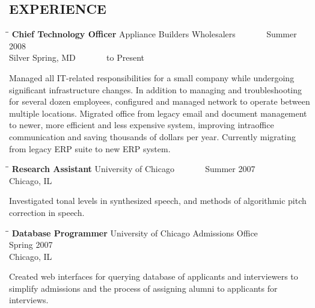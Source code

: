 \documentclass{res}
\begin{document}
\begin{resume}
\section{EXPERIENCE}
   \vspace{-0.1in}	
   \begin{tabbing}
   \hspace{2.3in}\= \hspace{2.6in}\= \kill %
    {\bf Chief Technology Officer} \>Appliance Builders Wholesalers \> ~~~~~~ Summer 2008 \\
                             \>Silver Spring, MD                    \> ~~~~~~ to Present
   \end{tabbing}\vspace{-20pt}      %
    Managed all IT-related responsibilities for a small company while undergoing significant
    infrastructure changes. In addition to managing and troubleshooting for several dozen employees,
    configured and managed network to operate between multiple locations. Migrated office from legacy
    email and document management to newer, more efficient and less expensive system, improving
    intraoffice communication and saving thousands of dollars per year. Currently migrating from legacy ERP
    suite to new ERP system.
   \begin{tabbing}
   \hspace{2.3in}\= \hspace{2.6in}\= \kill %
    {\bf Research Assistant} \>University of Chicago \> ~~~~~~ Summer 2007\\
                          \>Chicago, IL
   \end{tabbing}\vspace{-20pt}
   Investigated tonal levels in synthesized speech, and methods of algorithmic pitch correction
   in speech.
   \begin{tabbing}
   \hspace{2.3in}\= \hspace{2.6in}\= \kill %
    {\bf Database Programmer } \>University of Chicago Admissions Office \> ~~~~~~ Spring 2007\\
                             \>Chicago, IL
   \end{tabbing}\vspace{-20pt}      %
   Created web interfaces for querying database of applicants and interviewers to simplify admissions and the process of assigning alumni to applicants for interviews.

\end{resume}
\end{document}
